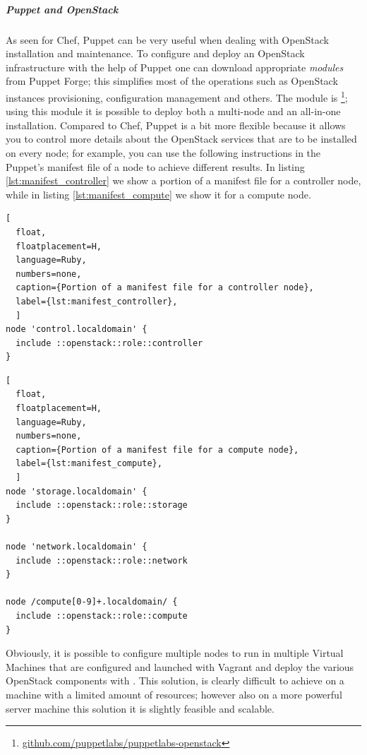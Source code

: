 \subparagraph{Puppet and OpenStack}
\label{subp:sota_puppet_openstack}

As seen for Chef, Puppet can be very useful when dealing with OpenStack installation and maintenance. To configure and deploy an OpenStack infrastructure with the help of Puppet one can download appropriate \textit{modules} from Puppet Forge; this simplifies most of the operations such as OpenStack instances provisioning, configuration management and others.
The module is \footnote{\url{github.com/puppetlabs/puppetlabs-openstack}}; using this module it is possible to deploy both a multi-node and an all-in-one installation. Compared to Chef, Puppet is a bit more flexible because it allows you to control more details about the OpenStack services that are to be installed on every node; for example, you can use the following instructions in the Puppet's manifest file of a node to achieve different results. In listing \ref{lst:manifest_controller} we show a portion of a manifest file for a controller node, while in listing \ref{lst:manifest_compute} we show it for a compute node.

\begin{lstlisting}[
  float,
  floatplacement=H,
  language=Ruby,
  numbers=none,
  caption={Portion of a manifest file for a controller node},
  label={lst:manifest_controller},
  ]
node 'control.localdomain' {
  include ::openstack::role::controller
}
\end{lstlisting}

\begin{lstlisting}[
  float,
  floatplacement=H,
  language=Ruby,
  numbers=none,
  caption={Portion of a manifest file for a compute node},
  label={lst:manifest_compute},
  ]
node 'storage.localdomain' {
  include ::openstack::role::storage
}

node 'network.localdomain' {
  include ::openstack::role::network
}

node /compute[0-9]+.localdomain/ {
  include ::openstack::role::compute
}
\end{lstlisting}

Obviously, it is possible to configure multiple nodes to run in multiple Virtual Machines that are configured and launched with Vagrant and deploy the various OpenStack components with . This solution, is clearly difficult to achieve on a machine with a limited amount of resources; however also on a more powerful server machine this solution it is slightly feasible and scalable.

